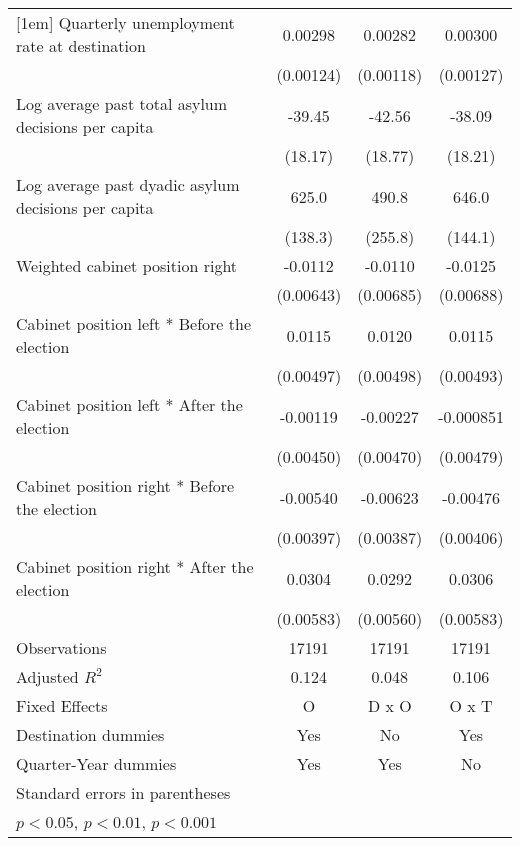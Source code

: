 \begin{table}[htbp]
\begin{tabular}{l*{3}{c}}
[1em]
Quarterly unemployment rate at destination&     0.00298\sym{*}  &     0.00282\sym{*}  &     0.00300\sym{*}  \\
                    &   (0.00124)         &   (0.00118)         &   (0.00127)         \\
[1em]
Log average past total asylum decisions per capita&      -39.45\sym{*}  &      -42.56\sym{*}  &      -38.09\sym{*}  \\
                    &     (18.17)         &     (18.77)         &     (18.21)         \\
[1em]
Log average past dyadic asylum decisions per capita&       625.0\sym{***}&       490.8         &       646.0\sym{***}\\
                    &     (138.3)         &     (255.8)         &     (144.1)         \\
[1em]
Weighted cabinet position right&     -0.0112         &     -0.0110         &     -0.0125         \\
                    &   (0.00643)         &   (0.00685)         &   (0.00688)         \\
[1em]
Cabinet position left * Before the election&      0.0115\sym{*}  &      0.0120\sym{*}  &      0.0115\sym{*}  \\
                    &   (0.00497)         &   (0.00498)         &   (0.00493)         \\
[1em]
Cabinet position left * After the election&    -0.00119         &    -0.00227         &   -0.000851         \\
                    &   (0.00450)         &   (0.00470)         &   (0.00479)         \\
[1em]
Cabinet position right * Before the election&    -0.00540         &    -0.00623         &    -0.00476         \\
                    &   (0.00397)         &   (0.00387)         &   (0.00406)         \\
[1em]
Cabinet position right * After the election&      0.0304\sym{***}&      0.0292\sym{***}&      0.0306\sym{***}\\
                    &   (0.00583)         &   (0.00560)         &   (0.00583)         \\
\hline
Observations        &       17191         &       17191         &       17191         \\
Adjusted \(R^{2}\)  &       0.124         &       0.048         &       0.106         \\
Fixed Effects       &           O         &       D x O         &       O x T         \\
Destination dummies &         Yes         &          No         &         Yes         \\
Quarter-Year dummies&         Yes         &         Yes         &          No         \\
\hline\hline
\multicolumn{4}{l}{\footnotesize Standard errors in parentheses}\\
\multicolumn{4}{l}{\footnotesize \sym{*} \(p<0.05\), \sym{**} \(p<0.01\), \sym{***} \(p<0.001\)}\\
\end{tabular}
\end{table}
